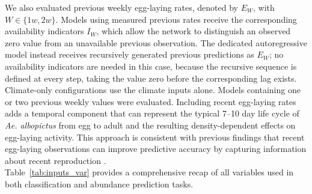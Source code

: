 \documentclass[preprint,12pt]{elsarticle}
\begin{document}
We also evaluated previous weekly egg-laying rates, denoted by $E_W$, with $W \in \{1w,2w\}$. Models using measured previous rates receive the corresponding availability indicators $I_W$, which allow the network to distinguish an observed zero value from an unavailable previous observation. The dedicated autoregressive model instead receives recursively generated previous predictions as $E_W$; no availability indicators are needed in this case, because the recursive sequence is defined at every step, taking the value zero before the corresponding lag exists. Climate-only configurations use the climate inputs alone. Models containing one or two previous weekly values were evaluated. Including recent egg-laying rates adds a temporal component that can represent the typical 7--10 day life cycle of \emph{Ae. albopictus} from egg to adult \cite{CDC} and the resulting density-dependent effects on egg-laying activity. This approach is consistent with previous findings that recent egg-laying observations can improve predictive accuracy by capturing information about recent reproduction \cite{Steindorf2025}.\\
Table~\ref{tab:inputs_var} provides a comprehensive recap of all variables used in both classification and abundance prediction tasks.
\end{document}
